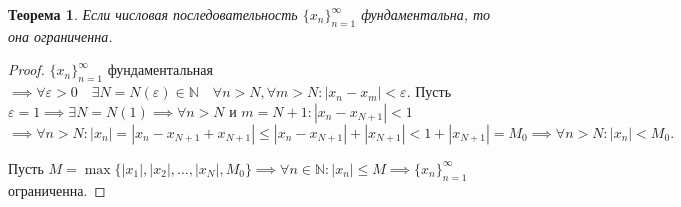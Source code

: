 \documentclass[a4paper,12pt]{article} %
\newtheorem{theorem}{Теорема}[subsection]
\theoremstyle{remark}
\begin{document}
\begin{theorem}
	Если числовая последовательность $\{x_n\}_{n=1}^{\infty}$ фундаментальна, то она ограниченна.
\end{theorem}
\begin{proof}
	$\{x_n\}_{n=1}^{\infty}$ фундаментальная $\implies\forall \varepsilon>0 \quad \exists N=N(\varepsilon)\in \mathbb{N} \quad \forall n>N, \forall m>N : |x_n-x_m| < \varepsilon$.
	Пусть $\varepsilon=1 \implies \exists N=N(1) \implies \forall n>N$ и $m=N+1 : |x_n - x_{N+1}|<1$ \\
	$\implies \forall n>N : |x_n| = |x_n - x_{N+1} + x_{N+1}| \le  |x_n - x_{N+1}| + |x_{N+1}| < 1 + |x_{N+1}| = M_0 \implies \forall n>N : |x_n| < M_0.$
	
	Пусть $M = \max \{|x_1|, |x_2|, \ldots, |x_N|, M_0\} \implies \forall n\in \mathbb{N} : |x_n| \le M \implies \{x_n\}_{n=1}^{\infty}$ ограниченна.
\end{proof}
\begin{center}
\end{center}
\end{document}
